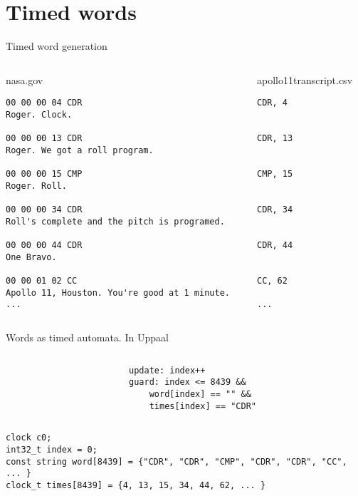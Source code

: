 \section{Timed words}
\begin{frame}[fragile]{Timed word generation}
    \begin{columns}
        \begin{column}{0.5\textwidth}
            nasa.gov
            \begin{lstlisting}[basicstyle=\tiny]
00 00 00 04 CDR
Roger. Clock.

00 00 00 13 CDR
Roger. We got a roll program.

00 00 00 15 CMP
Roger. Roll.

00 00 00 34 CDR
Roll's complete and the pitch is programed.

00 00 00 44 CDR
One Bravo.

00 00 01 02 CC
Apollo 11, Houston. You're good at 1 minute.
...
            \end{lstlisting}
        \end{column}
        \begin{column}{0.5\textwidth}
            apollo11transcript.csv
            \begin{lstlisting}[basicstyle=\tiny]
CDR, 4


CDR, 13


CMP, 15


CDR, 34


CDR, 44


CC, 62

...
            \end{lstlisting}
        \end{column}
    \end{columns}
\end{frame}

\begin{frame}[fragile]{Words as timed automata.}
    In Uppaal
    \begin{columns}
        \begin{column}{0.5\textwidth}
            
            
        \end{column}
        \begin{column}{0.5\textwidth}
            \begin{lstlisting}[basicstyle=\tiny]
update: index++
guard: index <= 8439 &&
    word[index] == "" &&
    times[index] == "CDR"
            \end{lstlisting}
        \end{column}
    \end{columns}
    \begin{lstlisting}[basicstyle=\tiny]
clock c0;
int32_t index = 0;
const string word[8439] = {"CDR", "CDR", "CMP", "CDR", "CDR", "CC", ... }
clock_t times[8439] = {4, 13, 15, 34, 44, 62, ... }
    \end{lstlisting}
\end{frame}

